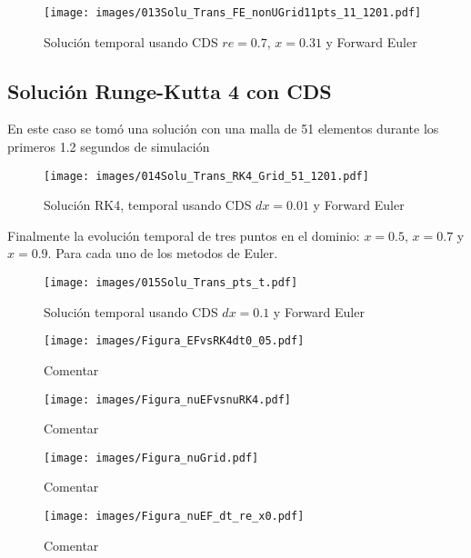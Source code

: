 \documentclass[9pt,technote,twoside,letterpaper,onecolumn]{IEEEtran}
\begin{document}
\begin{multicols}{2}
\begin{figure}[H]
  \centering
  \texttt{[image: images/013Solu\_Trans\_FE\_nonUGrid11pts\_11\_1201.pdf]}
  \caption{Solución temporal usando CDS $re=0.7$, $x=0.31$ y Forward Euler}
  \label{fig:trans_sol_non-cds_dx01}
\end{figure}

\subsection{Solución Runge-Kutta 4 con CDS}
\label{sec:sol_ucds_rk4_noncds}

En este caso se tomó una solución con una malla de 51 elementos durante los primeros 1.2 segundos de simulación
\begin{figure}[H]
  \centering
  \texttt{[image: images/014Solu\_Trans\_RK4\_Grid\_51\_1201.pdf]}
  \caption{Solución RK4, temporal usando CDS $dx=0.01$ y Forward Euler}
  \label{fig:trans_sol_rk4-cds_dx01}
\end{figure}

Finalmente la evolución temporal de tres puntos en el dominio: $x=0.5$, $x=0.7$ y $x=0.9$. Para cada uno de los metodos de Euler.
\begin{figure}[H]
  \centering
  \texttt{[image: images/015Solu\_Trans\_pts\_t.pdf]}
  \caption{Solución temporal usando CDS $dx=0.1$ y Forward Euler}
  \label{fig:trans_sol_pts_time_evol}
\end{figure}

\begin{figure*}
  \centering
  \texttt{[image: images/Figura\_EFvsRK4dt0\_05.pdf]}
  \caption{Comentar}
  \label{fig:dtvsdxuG}
\end{figure*}

\begin{figure*}
  \centering
  \texttt{[image: images/Figura\_nuEFvsnuRK4.pdf]}
  \caption{Comentar}
  \label{fig:dtvsdxnuG}
\end{figure*}

\begin{figure*}
  \centering
  \texttt{[image: images/Figura\_nuGrid.pdf]}
  \caption{Comentar}
  \label{fig:dtvsdxnuGs}
\end{figure*}

\begin{figure*}
  \centering
  \texttt{[image: images/Figura\_nuEF\_dt\_re\_x0.pdf]}
  \caption{Comentar}
  \label{fig:dtvsdxEFnuG}
\end{figure*}


\end{multicols}
\end{document}
